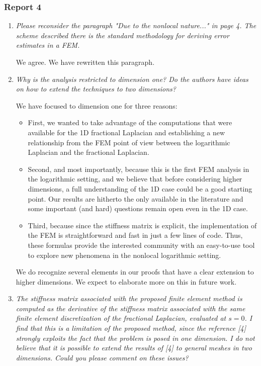 \documentclass[11 pt]{article}
\numberwithin{equation}{section}
\begin{document}
\subsubsection*{Report 4}

\begin{enumerate}
 \item
\emph{
Please reconsider the paragraph "Due to the nonlocal nature..." in page 4. The scheme described there is the standard methodology for deriving error estimates in a FEM.
}

We agree.  We have rewritten this paragraph.

\item \emph{
 Why is the analysis restricted to dimension one? Do the authors have ideas on how to extend the techniques to two dimensions?
}

We have focused to dimension one for three reasons:
\begin{itemize}
 \item First, we wanted to take advantage of the computations that were available for the 1D fractional Laplacian and establishing a new relationship from the FEM point of view between the logarithmic Laplacian and the fractional Laplacian.
 \item  Second, and most importantly, because this is the first FEM analysis in the logarithmic setting, and we believe that before considering higher dimensions, a full understanding of the 1D case could be a good starting point.  Our results are hitherto the only available in the literature and some important (and hard) questions remain open even in the 1D case.
 \item Third, because since the stiffness matrix is explicit, the implementation of the FEM is straightforward and fast in just a few lines of code. Thus, these formulas provide the interested community with an easy-to-use tool to explore new phenomena in the nonlocal logarithmic setting.
\end{itemize}


We do recognize several elements in our proofs that have a clear extension to higher dimensions. We expect to elaborate more on this in future work.


\item \emph{
 The stiffness matrix associated with the proposed finite element method is computed as the derivative of the stiffness matrix associated with the same finite element discretization of the fractional Laplacian, evaluated at $s=0$. I find that this is a limitation of the proposed method, since the reference [4] strongly exploits the fact that the problem is posed in one dimension. I do not believe that it is possible to extend the results of [4] to general meshes in two dimensions. Could you please comment on these issues?
}



\end{enumerate}
\end{document}
